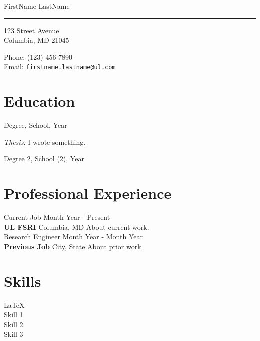 \documentclass[10pt,letterpaper]{article}
\def\name{FirstName LastName}
\renewenvironment{itemize}{
  \begin{list}{}{
    \setlength{\leftmargin}{1.5em}
  }
}{
  \end{list}
}
\begin{document}
{\huge \name} \\
\noindent\rule{17cm}{0.4pt}


\vspace{0.25in}

\begin{minipage}[t]{0.5\textwidth}
  123 Street Avenue \\
  Columbia, MD  21045\\
\end{minipage}
\begin{minipage}[t]{0.5\textwidth}
  Phone: (123) 456-7890 \\
  Email: \href{mailto:firstname.lastname@ul.com} {\tt firstname.lastname@ul.com}\\

\end{minipage}

\section*{Education}

\begin{itemize}
  \item Degree, School, Year
    \begin{itemize}
      \item \textit{Thesis:} I wrote something.
    \end{itemize}

  \item Degree 2, School (2), Year

\end{itemize}

\section*{Professional Experience}
Current Job \hfill Month Year - Present \\
{\bf UL FSRI} \hfill Columbia, MD \vskip3pt
About current work. \\

Research Engineer \hfill Month Year - Month Year \\
{\bf Previous Job} \hfill City, State \vskip3pt
About prior work.\\

\section*{Skills}
\LaTeX \\
Skill 1 \\
Skill 2 \\
Skill 3\\
\end{document}
